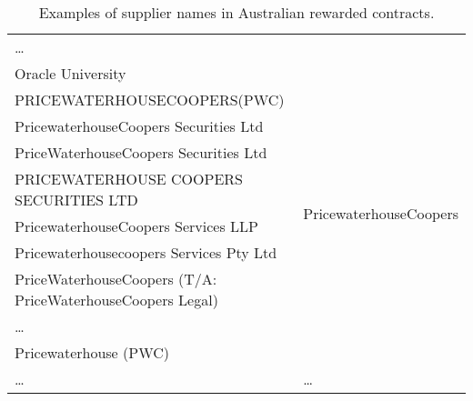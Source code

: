 \documentclass{llncs}
\begin{document}
\begin{table}[!htb]
\begin{center}
\begin{tabular}{|l|l|}
  \ldots  & \\
  Oracle University  & \\ \hline
  PRICEWATERHOUSECOOPERS(PWC)  & \multirow{8}{*}{PricewaterhouseCoopers} \\
  PricewaterhouseCoopers Securities Ltd & \\
  PriceWaterhouseCoopers Securities Ltd & \\
  PRICEWATERHOUSE COOPERS SECURITIES LTD & \\
  PricewaterhouseCoopers Services LLP & \\
  Pricewaterhousecoopers Services Pty Ltd & \\
  PriceWaterhouseCoopers (T/A: PriceWaterhouseCoopers Legal) & \\
  \ldots  & \\
  Pricewaterhouse (PWC) & \\ \hline
  \ldots & \ldots \\
  \hline
  \end{tabular}
  \caption{Examples of supplier names in Australian rewarded contracts.}
  \label{tabla:aus-suppliers}
  \end{center}
\end{table} 
\end{document}
